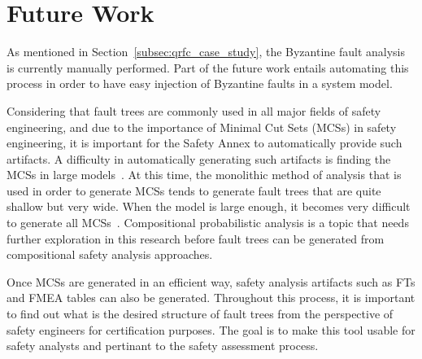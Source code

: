 \section{Future Work}
\label{sec:future_work}
As mentioned in Section~\ref{subsec:qrfc_case_study}, the Byzantine fault analysis is currently manually performed. Part of the future work entails automating this process in order to have easy injection of Byzantine faults in a system model. 

Considering that fault trees are commonly used in all major fields of safety engineering, and due to the importance of Minimal Cut Sets (MCSs) in safety engineering, it is important for the Safety Annex to automatically provide such artifacts. A difficulty in automatically generating such artifacts is finding the MCSs in large models~\cite{CAV2015:BoCiGrMa, 10.1007/978-3-540-75596-8-13,0f356f05e72f43018211b36f97c8854a}. At this time, the monolithic method of analysis that is used in order to generate MCSs tends to generate fault trees that are quite shallow but very wide. When the model is large enough, it becomes very difficult to generate all MCSs~\cite{mattarei}. Compositional probabilistic analysis is a topic that needs further exploration in this research before fault trees can be generated from compositional safety analysis approaches. 

Once  MCSs are generated in an efficient way, safety analysis artifacts such as FTs and FMEA tables can also be generated. Throughout this process, it is important to find out what is the desired structure of fault trees from the perspective of safety engineers for certification purposes. The goal is to make this tool usable for safety analysts and pertinant to the safety assessment process.

